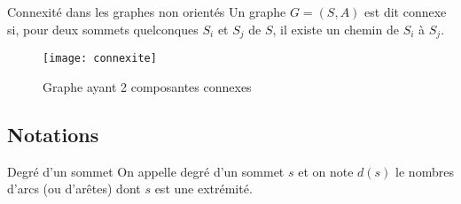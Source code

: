 %
%
%
%


%



\begin{defi}{Connexité dans les graphes non orientés}
Un graphe $G=(S,A)$ est dit connexe si, pour deux sommets quelconques $S_i$ et $S_j$ de $S$, il existe un chemin de $S_i$ à $S_j$.
\end{defi}

\begin{exemple}
\begin{figure}[H]
\centering
\texttt{[image: connexite]}
\captionsetup{justification=centering}
\caption{Graphe ayant 2 composantes connexes}
\end{figure}
\end{exemple}

\subsection{Notations}
\begin{defi}{Degré d'un sommet}
On appelle degré d'un sommet $s$ et on note $d\left(s\right)$ le nombres d'arcs (ou d'arêtes) dont $s$ est une extrémité.
\end{defi}


